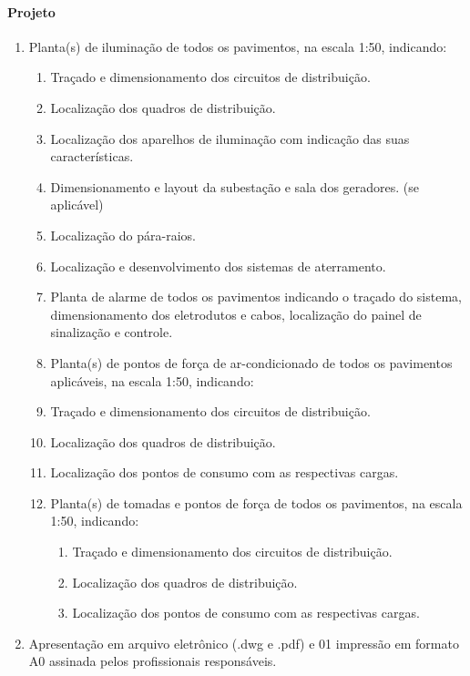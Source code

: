 \paragraph{Projeto}
\begin{enumerate}
		\item Planta(s) de iluminação de todos os pavimentos, na escala 1:50, indicando:
		\begin{enumerate}
			\item Traçado e dimensionamento dos circuitos de distribuição.
			\item Localização dos quadros de distribuição.
			\item Localização dos aparelhos de iluminação com indicação das suas características.
			\item Dimensionamento e layout da subestação e sala dos geradores. (se aplicável)
			\item Localização do pára-raios.
			\item Localização e desenvolvimento dos sistemas de aterramento.
			\item Planta de alarme de todos os pavimentos indicando o traçado do sistema, dimensionamento dos eletrodutos e cabos, localização do painel de sinalização e controle.
			\item Planta(s) de pontos de força de ar-condicionado de todos os pavimentos aplicáveis, na escala 1:50, indicando:
			\item Traçado e dimensionamento dos circuitos de distribuição.
			\item Localização dos quadros de distribuição.
			\item Localização dos pontos de consumo com as respectivas cargas.
			\item Planta(s) de tomadas e pontos de força de todos os pavimentos, na escala 1:50, indicando:
				\begin{enumerate}
					\item Traçado e dimensionamento dos circuitos de distribuição.
					\item Localização dos quadros de distribuição.
					\item Localização dos pontos de consumo com as respectivas cargas.
				\end{enumerate}
		\end{enumerate}
	
		\item Apresentação em arquivo eletrônico (.dwg e .pdf) e 01 impressão em formato A0 assinada pelos profissionais responsáveis.	
\end{enumerate}

